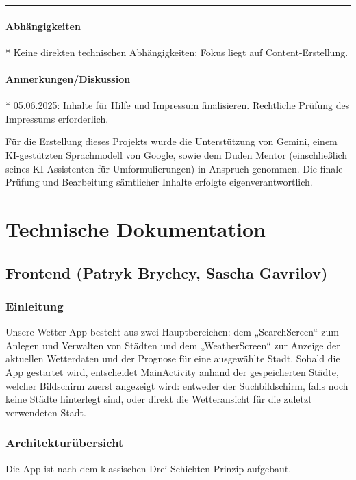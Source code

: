 \documentclass{article}
\begin{document}
\vspace{0.5em}
\hrule

\paragraph{Abhängigkeiten}
* Keine direkten technischen Abhängigkeiten; Fokus liegt auf Content-Erstellung.

\paragraph{Anmerkungen/Diskussion}
* 05.06.2025: Inhalte für Hilfe und Impressum finalisieren. Rechtliche Prüfung des Impressums erforderlich.

\vfill
\small 
Für die Erstellung dieses Projekts wurde die Unterstützung von Gemini, einem KI-gestützten Sprachmodell von Google, sowie dem Duden Mentor (einschließlich seines KI-Assistenten für Umformulierungen) in Anspruch genommen. Die finale Prüfung und Bearbeitung sämtlicher Inhalte erfolgte eigenverantwortlich.
\normalsize


\newpage

\section{Technische Dokumentation}
\subsection{Frontend \small{(Patryk Brychcy, Sascha Gavrilov)}}
\subsubsection{Einleitung}
Unsere Wetter-App besteht aus zwei Hauptbereichen: dem „SearchScreen“ zum Anlegen und Verwalten von Städten und dem „WeatherScreen“ zur Anzeige der aktuellen Wetterdaten und der Prognose für eine ausgewählte Stadt. Sobald die App gestartet wird, entscheidet MainActivity anhand der gespeicherten Städte, welcher Bildschirm zuerst angezeigt wird: entweder der Suchbildschirm, falls noch keine Städte hinterlegt sind, oder direkt die Wetteransicht für die zuletzt verwendeten Stadt.

\subsubsection{Architekturübersicht}
Die App ist nach dem klassischen Drei-Schichten-Prinzip aufgebaut.
\end{document}

